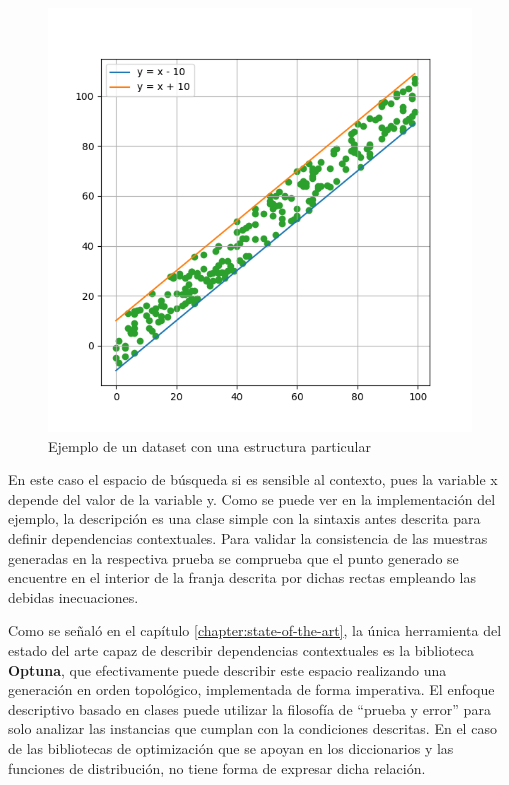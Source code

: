 \begin{figure}[!ht]
      \includegraphics[width=\linewidth]{Graphics/center.png}
      \caption{Ejemplo de un dataset con una estructura particular}
      \label{fig:centers}
\end{figure}

En este caso el espacio de búsqueda si es sensible al contexto, pues la variable x depende del 
valor de la variable y. Como se puede ver en la
implementación del ejemplo, la descripción es una clase simple con la sintaxis antes descrita para definir
dependencias contextuales. Para validar la consistencia de las muestras generadas en la respectiva prueba se
comprueba que el punto generado se encuentre en el interior de la franja descrita por dichas rectas empleando
las debidas inecuaciones.

Como se señaló en el capítulo \ref{chapter:state-of-the-art}, la única herramienta del estado del arte capaz de
describir dependencias contextuales es la biblioteca {\bf Optuna}, que efectivamente puede describir este espacio
realizando una generación en orden topológico, implementada de forma imperativa. El enfoque descriptivo basado en clases
puede utilizar la filosofía de ``prueba y error'' para solo analizar las instancias que cumplan con la condiciones
descritas. En el caso de las bibliotecas de optimización que se apoyan en los diccionarios y las funciones de
distribución, no tiene forma de expresar dicha relación.

